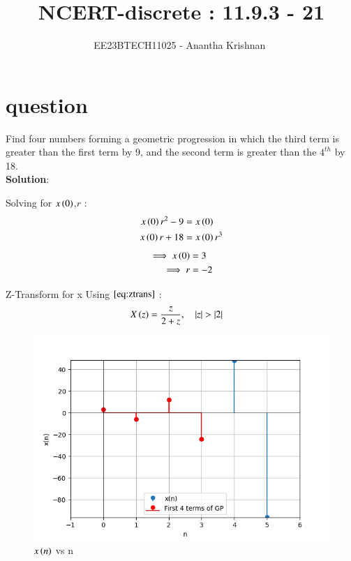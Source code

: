 \documentclass[journal,12pt,onecolumn]{IEEEtran}
\theoremstyle{remark}
\begin{document}

\vspace{3cm}

\title{NCERT-discrete : 11.9.3 - 21}
\author{EE23BTECH11025 - Anantha Krishnan $^{}$%
}
\maketitle
\bigskip

\renewcommand{\thefigure}{\theenumi}
\renewcommand{\thetable}{\theenumi}
\section{question}
Find four numbers forming a geometric progression in which the third term is greater than the first term by 9, and the second term is greater than the $4^{th}$ by 18.\\

\textbf{Solution}:

    
\begin{enumerate}
    Solving for $x\left(0\right)$,$r$ :
   \begin{align}
x\left(0\right)r^2 - 9 &= x\left(0\right) \label{eq:ee25-a1}\\
x\left(0\right)r + 18 &= x\left(0\right)r^3\label{eq:ee25-a2}
\end{align}
\begin{align}
    \implies
    x\left(0\right) &= 3\\
    \implies
    r &= -2
\end{align}

 Z-Transform for x 
    Using $\eqref{eq:ztrans}$ :
    \begin{align}
    X\left(z\right) &= \frac{z}{2+z} ,\quad \left\vert z\right\vert>\left\vert2\right\vert 
    \end{align}
    
\end{enumerate}
    \begin{figure}[!ht]    
    \centering
\graphicspath{ {figs/} }
\includegraphics[width=\columnwidth]{graph_1}
\caption{ $x\left(n\right)$ vs n }
\label{graph:ee25-ag2}
\end{figure}







 
\end{document}
